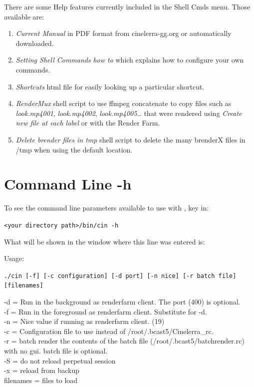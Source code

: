 There are some Help features currently included in the Shell Cmds menu. Those available are:

\begin{enumerate}
	\item \textit{Current Manual} in PDF format from cinelerra-gg.org or automatically downloaded.
	\item \textit{Setting Shell Commands} \textit{how to} which explains how to configure your own commands.
	\item \textit{Shortcuts} html file for easily looking up a particular shortcut.
	\item \textit{RenderMux} shell script to use ffmpeg concatenate to copy files such as \textit{look.mp4001}, \textit{look.mp4002}, \textit{look.mp4005}{\dots} that were rendered using \textit{Create new file at each label} or with the Render Farm.
	\item \textit{Delete brender files in tmp} shell script to delete the many brenderX files in /tmp when using the default location.
\end{enumerate}

\section{\CGG{} Command Line -h}%
\label{cha:cinelerra_command_line_-h}

To see the command line parameters available to use with \CGG{}, key in:

\qquad \texttt{<your \CGG{} directory path>/bin/cin -h}

What will be shown in the window where this line was entered is:

Usage:

\texttt{./cin [-f] [-c configuration] [-d port] [-n nice] [-r batch file] [filenames]}

-d = Run in the background as renderfarm client.  The port (400) is optional.\\
-f = Run in the foreground as renderfarm client. Substitute for -d.\\
-n = Nice value if running as renderfarm client. (19)\\
-c = Configuration file to use instead of /root/.bcast5/Cinelerra\_rc.\\
-r = batch render the contents of the batch file (/root/.bcast5/batchrender.rc) with no gui. batch file is optional.\\
-S = do not reload perpetual session\\
-x = reload from backup\\
filenames = files to load

